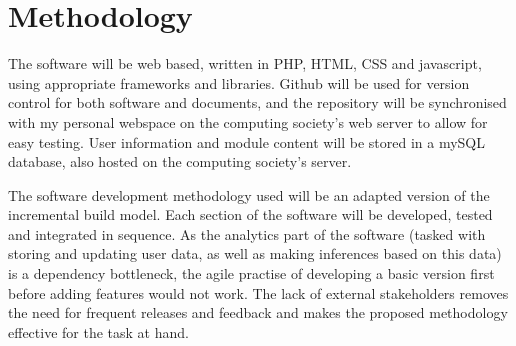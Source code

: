 \documentclass{report}
\begin{document}
\section*{Methodology}
The software will be web based, written in PHP, HTML, CSS and javascript, using appropriate frameworks and libraries. Github will be used for version control for both software and documents, and the repository will be synchronised with my personal webspace on the computing society's web server to allow for easy testing. User information and module content will be stored in a mySQL database, also hosted on the computing society's server.

The software development methodology used will be an adapted version of the incremental build model. Each section of the software will be developed, tested and integrated in sequence.  As the analytics part of the software (tasked with storing and updating user data, as well as making inferences based on this data) is a dependency bottleneck, the agile practise of developing a basic version first before adding features would not work. The lack of external stakeholders removes the need for frequent releases and feedback and makes the proposed methodology effective for the task at hand.
\end{document}
